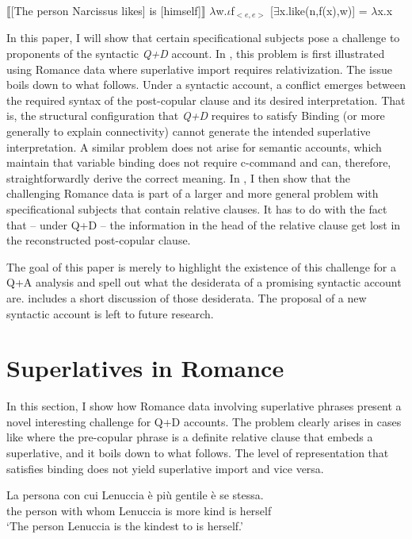 \documentclass[output=paper,colorlinks,citecolor=brown,draft,draftmode]{langscibook}
\begin{document}
\ea \ea \label{quantifrep} $\llbracket${[The person Narcissus likes] is [himself]}$\rrbracket$
\ex \label{denotationcase}$\lambda$w.$\iota$f$_{<e,e>}$ [$\exists$x.like(n,f(x),w)] = $\lambda$x.x
\z
\z

In this paper, I will show  that certain specificational subjects pose a challenge to proponents of the syntactic \textit{Q+D} account. In , this problem is first illustrated using Romance data where superlative import requires relativization. The issue boils
down to what follows. Under a syntactic account, a conflict emerges between the required syntax of the post-copular clause and its desired interpretation. That is, the structural configuration that \textit{Q+D} requires to
satisfy Binding (or more generally to explain connectivity) cannot generate the intended superlative interpretation. A similar problem
does not arise for semantic accounts, which maintain that variable binding does not require c-command and
can, therefore, straightforwardly derive the correct meaning.
In  , I then show that the challenging Romance data is part of a larger and more general problem with specificational subjects that contain relative clauses. It has to do with the fact that -- under Q+D -- the information in the head of the relative clause get lost in the reconstructed post-copular clause.

The goal of this paper is merely to highlight the existence of this challenge for a Q+A analysis and spell out what the desiderata of a promising syntactic account are.  includes a short discussion of those desiderata. The proposal of a new syntactic account is left to future research.

\section{Superlatives in Romance}
\label{secromance}


In this section, I show how Romance data involving superlative phrases present a novel interesting challenge for Q+D accounts. %
The problem clearly arises in cases like  where the pre-copular phrase is a definite relative clause that embeds a superlative, and it boils down to what follows.
The level of representation that satisfies binding does not yield superlative import and vice versa.


\ea\label{exemplificat}
\gll La persona con cui Lenuccia è più gentile è {se stessa}.\\
the person with whom Lenuccia is more kind is herself \\
\glt `The person Lenuccia is the kindest to is herself.'
\z
\end{document}
